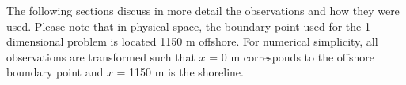The following sections discuss in more detail the observations and how they were used. Please note that in physical space, the boundary point used for the 1-dimensional problem is located 1150 m offshore. For numerical simplicity, all observations are transformed such that $\textit{x}$ = 0 m corresponds to the offshore boundary point and $\textit{x}$ = 1150 m is the shoreline. 

